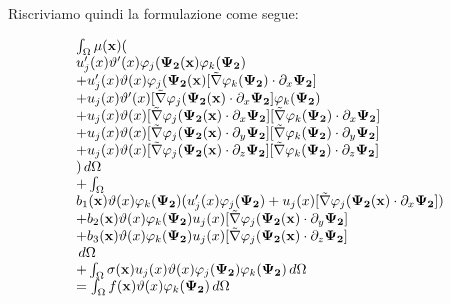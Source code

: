 Riscriviamo quindi la formulazione come segue:

\begin{equation}
\label{eq: formulazione 1}
\begin{array}{l}
\int_\Omega \mu(\mathbf{x})
(\\
u_j'(x)\vartheta'(x)\varphi_j(\mathbf{\Psi_2}(\mathbf{x})\varphi_k(\mathbf{\Psi_2}) \\

+ u_j'(x)\vartheta(x)\varphi_j(\mathbf{\Psi_2}(\mathbf{x})[\tilde{\nabla}\varphi_k(\mathbf{\Psi_2}) \cdot \partial_x\mathbf{\Psi_2}]\\

+u_j(x)\vartheta'(x)[\tilde{\nabla}\varphi_j(\mathbf{\Psi_2}(\mathbf{x})\cdot \partial_x\mathbf{\Psi_2}]\varphi_k(\mathbf{\Psi_2}) \\

+u_j(x)\vartheta(x)[\tilde{\nabla}\varphi_j(\mathbf{\Psi_2}(\mathbf{x})\cdot \partial_x\mathbf{\Psi_2}][\tilde{\nabla}\varphi_k(\mathbf{\Psi_2})\cdot \partial_x\mathbf{\Psi_2}] \\

+u_j(x)\vartheta(x)[\tilde{\nabla}\varphi_j(\mathbf{\Psi_2}(\mathbf{x})\cdot \partial_y\mathbf{\Psi_2}][\tilde{\nabla}\varphi_k(\mathbf{\Psi_2})\cdot \partial_y\mathbf{\Psi_2}] \\

+u_j(x)\vartheta(x)[\tilde{\nabla}\varphi_j(\mathbf{\Psi_2}(\mathbf{x})\cdot \partial_z\mathbf{\Psi_2}][\tilde{\nabla}\varphi_k(\mathbf{\Psi_2})\cdot \partial_z\mathbf{\Psi_2}] \\
 )\,d\Omega \\
 
 + \int_\Omega \\
 b_1(\mathbf{x})\vartheta(x)\varphi_k(\mathbf{\Psi_2})
 (u_j'(x)\varphi_j(\mathbf{\Psi_2})+u_j(x)[\tilde{\nabla}\varphi_j(\mathbf{\Psi_2}(\mathbf{x})\cdot \partial_x\mathbf{\Psi_2}]) \\
 + b_2(\mathbf{x})\vartheta(x)\varphi_k(\mathbf{\Psi_2})
u_j(x)[\tilde{\nabla}\varphi_j(\mathbf{\Psi_2}(\mathbf{x})\cdot \partial_y\mathbf{\Psi_2}] \\
+
b_3(\mathbf{x})\vartheta(x)\varphi_k(\mathbf{\Psi_2})
u_j(x)[\tilde{\nabla}\varphi_j(\mathbf{\Psi_2}(\mathbf{x})\cdot \partial_z\mathbf{\Psi_2}] \\
\,d\Omega\\
+
\int_\Omega \sigma(\mathbf{x})u_j(x)\vartheta(x)\varphi_j(\mathbf{\Psi_2})
\varphi_k(\mathbf{\Psi_2})
\,d\Omega\\
= \int_\Omega f(\mathbf{x})\vartheta(x)\varphi_k(\mathbf{\Psi_2})
\,d\Omega
\end{array}
\end{equation}